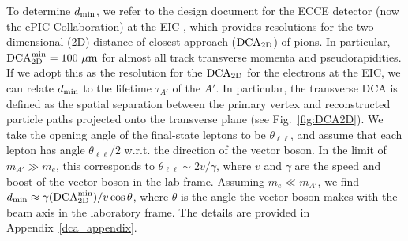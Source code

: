 To determine $d_{\rm min}$, we refer to the design document for the ECCE detector (now the ePIC Collaboration) at the EIC \cite{Adkins:2022jfp}, which provides resolutions for the two-dimensional (2D) distance of closest approach (${\rm DCA}_{\rm 2D}$) of pions. In particular, ${\rm DCA}_{\rm 2D}^{\rm min} = 100~{\rm \mu m}$ for almost all track transverse momenta and pseudorapidities. If we adopt this as the resolution for the ${\rm DCA}_{\rm 2D}$ for the electrons at the EIC, we can relate $d_{\rm min}$ to the lifetime $\tau_{A'}$ of the $A'$. In particular, the transverse DCA is defined as the spatial separation between the primary vertex and reconstructed particle paths projected onto the transverse plane (see Fig.~\ref{fig:DCA2D}). We take the opening angle of the final-state leptons to be $\theta_{\ell\ell}$, and assume that each lepton has angle $\theta_{\ell\ell}/2$ w.r.t. the direction of the vector boson. In the limit of $m_{A'} \gg m_e$, this corresponds to $\theta_{\ell\ell} \sim 2v/\gamma$, where $v$ and $\gamma$ are the speed and boost of the vector boson in the lab frame. Assuming $m_e \ll m_{A'}$, we find $d_{\rm min} \approx \gamma({\rm DCA}_{\rm 2D}^{\rm min})/v \cos{\theta}$, where $\theta$ is the angle the vector boson makes with the beam axis in the laboratory frame. The details are provided in Appendix~\ref{dca_appendix}.

